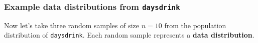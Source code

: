 \begin{frame}
\frametitle{Example data distributions from \texttt{days\textunderscore drink}}
 Now let's take three random samples of size $n=10$ from the population distribution of \texttt{days\textunderscore drink}.  Each random sample represents a \textbf{data distribution}.\\
 \vskip10pt
 \hspace*{-20pt}
\end{frame}

